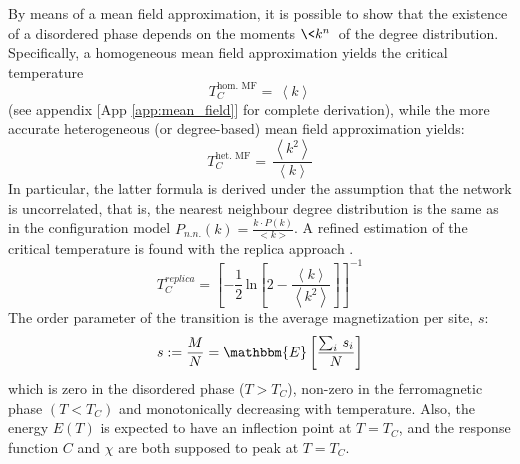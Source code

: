 By means of a mean field approximation, it is possible to show that the existence of a disordered phase depends on the moments $\<k^n\>$ of the degree distribution. Specifically, a homogeneous mean field approximation yields the critical temperature
\begin{equation} \label{eq:hom_mean_field}
    T_C^{\text{hom. MF}} =\,\left\langle k \right \rangle
\end{equation}
(see appendix [App \ref{app:mean_field}] for complete derivation), while the more accurate heterogeneous (or degree-based) mean field approximation yields:
\begin{equation} \label{eq:het_mean_field}
    T_C^{\text{het. MF}} =\,\frac{\left\langle k^2 \right \rangle}{\left\langle k \right \rangle}
\end{equation}
In particular, the latter formula is derived under the assumption that the network is uncorrelated, that is, the nearest neighbour degree distribution is the same as in the configuration model $P_{n.n.} (k)=\frac{k\cdot P(k)}{<k>}$.
A refined estimation of the critical temperature is found with the replica approach \cite{analytical_ising}. \\ 
\begin{equation}
    T_C^{replica} = \left[ -\frac{1}{2}\,\text{ln}\left[2- \frac{\left\langle k \right\rangle}{\left\langle k^2 \right\rangle}\right]\right]^{-1}
\label{eq:replica}    
\end{equation}
The order parameter of the transition is the average magnetization per site, $s$:
$$
s := \frac{M}{N} = \mathbbm{E}\left[\frac{\sum_{i}\,s_i}{N}\right]
$$
which is zero in the disordered phase ($T>T_C$), non-zero in the ferromagnetic  phase $(T<T_C)$ and monotonically decreasing with temperature. Also, the energy $E(T)$ is expected to have an inflection point at $T=T_C$, and the response function $C$ and $\chi$ are both supposed to peak at $T=T_C$.

